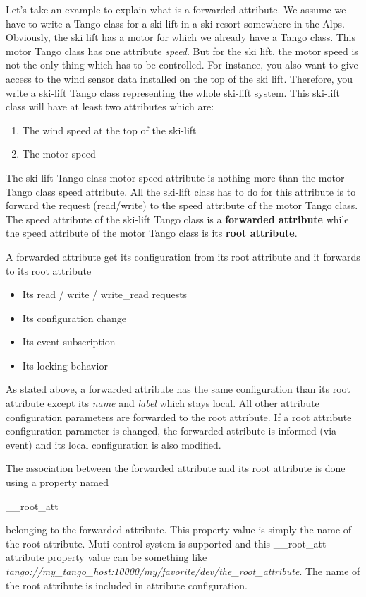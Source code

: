Let's take an example to explain what is a forwarded attribute. We
assume we have to write a Tango class for a ski lift in a ski resort
somewhere in the Alps. Obviously, the ski lift has a motor for which
we already have a Tango class. This motor Tango class has one attribute
\emph{speed}. But for the ski lift, the motor speed is not the only
thing which has to be controlled. For instance, you also want to give
access to the wind sensor data installed on the top of the ski lift.
Therefore, you write a ski-lift Tango class representing the whole
ski-lift system. This ski-lift class will have at least two attributes
which are:
\begin{enumerate}
\item The wind speed at the top of the ski-lift
\item The motor speed
\end{enumerate}
The ski-lift Tango class motor speed attribute is nothing more than
the motor Tango class speed attribute. All the ski-lift class has
to do for this attribute is to forward the request (read/write) to
the speed attribute of the motor Tango class. The speed attribute
of the ski-lift Tango class is a \textbf{forwarded attribute}
while the speed attribute of the motor Tango class is its \textbf{root
attribute}.

A forwarded attribute get its configuration from its root attribute
and it forwards to its root attribute
\begin{itemize}
\item Its read / write / write\_read requests
\item Its configuration change
\item Its event subscription
\item Its locking behavior
\end{itemize}
As stated above, a forwarded attribute has the same configuration
than its root attribute except its \emph{name} and \emph{label} which
stays local. All other attribute configuration parameters are forwarded
to the root attribute. If a root attribute configuration parameter
is changed, the forwarded attribute is informed (via event) and its
local configuration is also modified.

The association between the forwarded attribute and its root attribute
is done using a property named \begin{center}\_\_root\_att\end{center}
belonging to the forwarded attribute. This property value is simply
the name of the root attribute. Muti-control system is supported and
this \_\_root\_att attribute property
value can be something like \emph{tango://my\_tango\_host:10000/my/favorite/dev/the\_root\_attribute}.
The name of the root attribute is included in attribute configuration.

